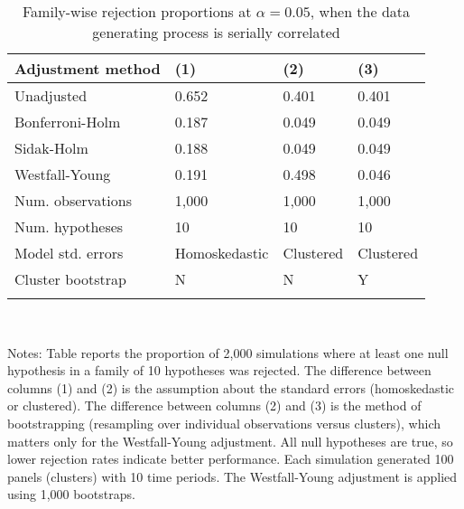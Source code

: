 \documentclass{article}
\begin{document}
\begin{table}[tbp] \centering
{}

\caption{Family-wise rejection proportions at \(\alpha = 0.05\), when the data generating process is serially correlated}
\label{tab:wyoung2}
\begin{tabularx}{\linewidth}{@{}lCCC@{}}

\toprule
{Adjustment method}&{(1)}&{(2)}&{(3)} \tabularnewline
\midrule \addlinespace[\belowrulesep]
Unadjusted&0.652&0.401&0.401 \tabularnewline
Bonferroni-Holm&0.187&0.049&0.049 \tabularnewline
Sidak-Holm&0.188&0.049&0.049 \tabularnewline
Westfall-Young&0.191&0.498&0.046 \tabularnewline
\midrule Num. observations&1,000&1,000&1,000 \tabularnewline
Num. hypotheses&10&10&10 \tabularnewline
Model std. errors&Homoskedastic&Clustered&Clustered \tabularnewline
Cluster bootstrap&N&N&Y \tabularnewline
\bottomrule \addlinespace[\belowrulesep]

\end{tabularx}
\\ \parbox{\linewidth}{\footnotesize Notes: Table reports the proportion of 2,000 simulations where at least one null hypothesis in a family of 10 hypotheses was rejected. The difference between columns (1) and (2) is the assumption about the standard errors (homoskedastic or clustered). The difference between columns (2) and (3) is the method of bootstrapping (resampling over individual observations versus clusters), which matters only for the Westfall-Young adjustment. All null hypotheses are true, so lower rejection rates indicate better performance. Each simulation generated 100 panels (clusters) with 10 time periods. The Westfall-Young adjustment is applied using 1,000 bootstraps.}
\end{table}
\end{document}
